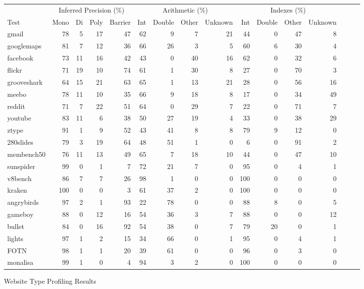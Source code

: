 \begin{figure*}
\begin{center}
\begin{tabular}{lrrrrrrrrrrrrrrr}
\toprule
& \multicolumn{4}{c}{Inferred Precision (\%)}
& \multicolumn{4}{c}{Arithmetic (\%)}
& \multicolumn{4}{c}{Indexes (\%)} \\

\cmidrule(r){2-5}
\cmidrule(r){6-9}
\cmidrule{10-13}

Test
& Mono & Di & Poly & Barrier
& Int & Double & Other & Unknown
& Int & Double & Other & Unknown \\
\midrule
gmail          & 78 & 5  & 17 & 47 & 62 & 9  & 7  & 21 & 44 & 0 & 47 & 8 \\
googlemaps     & 81 & 7  & 12 & 36 & 66 & 26 & 3  & 5  & 60 & 6 & 30 & 4 \\
facebook       & 73 & 11 & 16 & 42 & 43 & 0 & 40 & 16 & 62 & 0 & 32 & 6 \\
flickr         & 71 & 19 & 10 & 74 & 61 & 1 & 30 & 8 & 27 & 0 & 70 & 3 \\
grooveshark    & 64 & 15 & 21 & 63 & 65 & 1 & 13 & 21 & 28 & 0 & 56 & 16 \\
meebo          & 78 & 11 & 10 & 35 & 66 & 9 & 18 & 8 & 17 & 0 & 34 & 49 \\
reddit         & 71 & 7 & 22 & 51 & 64 & 0 & 29 & 7 & 22 & 0 & 71 & 7 \\
youtube        & 83 & 11 & 6 & 38 & 50 & 27 & 19 & 4 & 33 & 0 & 38 & 29 \\
ztype          & 91 & 1 & 9 & 52 & 43 & 41 & 8 & 8 & 79 & 9 & 12 & 0 \\
280slides      & 79 & 3 & 19 & 64 & 48 & 51 & 1 & 0 & 6 & 0 & 91 & 2 \\
membench50     & 76 & 11 & 13 & 49 & 65 & 7  & 18 & 10 & 44 & 0 & 47 & 10 \\
sunspider      & 99 & 0  & 1  & 7  & 72 & 21 & 7  & 0  & 95 & 0 & 4  & 1  \\
v8bench        & 86 & 7  & 7  & 26 & 98 & 1  & 0  & 0  & 100 & 0 & 0 & 0  \\
kraken         & 100 & 0 & 0  & 3  & 61 & 37 & 2  & 0  & 100 & 0 & 0 & 0  \\
angrybirds     & 97 & 2 & 1 & 93 & 22 & 78 & 0 & 0 & 88 & 8 & 0 & 5 \\
gameboy        & 88 & 0 & 12 & 16 & 54 & 36 & 3 & 7 & 88 & 0 & 0 & 12 \\
bullet         & 84 & 0 & 16 & 92 & 54 & 38 & 0 & 7 & 79 & 20 & 0 & 1 \\
lights         & 97 & 1 & 2 & 15 & 34 & 66 & 0 & 1 & 95 & 0 & 4 & 1 \\
FOTN           & 98 & 1 & 1 & 20 & 39 & 61 & 0 & 0 & 96 & 0 & 3 & 0 \\
monalisa       & 99 & 1 & 0 & 4 & 94 & 3 & 2 & 0 & 100 & 0 & 0 & 0 \\
\bottomrule
\end{tabular}
\end{center}
\nocaptionrule \caption{Website Type Profiling Results}
\end{figure*}

